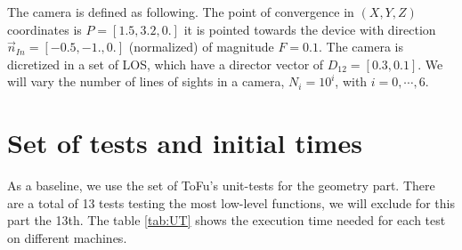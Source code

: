 \documentclass[11pt]{amsart}
\begin{document}
The camera is defined as following.
The point of convergence in $(X,Y,Z)$ coordinates is $P = [1.5,3.2,0.]$ it is pointed towards the
device with direction $\vec{n}_{In} = [-0.5,-1.,0.]$ (normalized) of magnitude $F = 0.1$. The
camera is dicretized in a set of LOS, which have a director vector of $D_{12} = [0.3,0.1]$.
We will vary the number of lines of sights in a camera, $N_i = 10^i$, with $i=0, \cdots, 6$.\\

\section{Set of tests and initial times}

As a baseline, we use the set of ToFu's unit-tests for the geometry part. There are a total of 13
tests testing the most low-level functions, we will exclude for this part the 13th.
The table \ref{tab:UT} shows the execution time needed
for each test on different machines.
\end{document}
